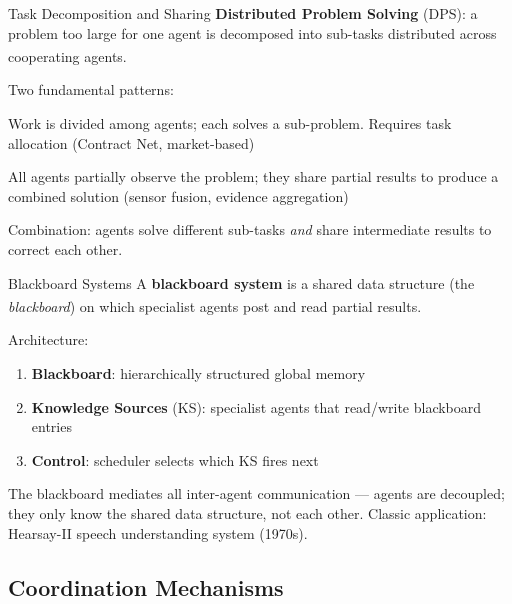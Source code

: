 \begin{v3topic}{Task Decomposition and Sharing}
    \textbf{Distributed Problem Solving} (DPS): a problem too large for one
    agent is decomposed into sub-tasks distributed across cooperating agents.
    \textsuperscript{\cite[][p.~154]{weissMultiagentSystems2013}}

    Two fundamental patterns:
    \begin{description}[leftmargin=0.6cm, labelindent=0pt]
        \item[\textbf{Task sharing}] Work is divided among agents; each solves a sub-problem.
              Requires task allocation (Contract Net, market-based)
        \item[\textbf{Result sharing}] All agents partially observe the problem; they share
              partial results to produce a combined solution (sensor fusion, evidence aggregation)
    \end{description}
    Combination: agents solve different sub-tasks \emph{and} share intermediate
    results to correct each other.

\end{v3topic}
\begin{v3topic}{Blackboard Systems}
    A \textbf{blackboard system} is a shared data structure (the
    \emph{blackboard}) on which specialist agents post and read partial
    results.\textsuperscript{\cite[][p.~157]{weissMultiagentSystems2013}}

    Architecture:
    \begin{enumerate}
        \item \textbf{Blackboard}: hierarchically structured global memory
        \item \textbf{Knowledge Sources} (KS): specialist agents that read/write blackboard entries
        \item \textbf{Control}: scheduler selects which KS fires next
    \end{enumerate}
    The blackboard mediates all inter-agent communication --- agents are
    decoupled; they only know the shared data structure, not each other.
    Classic application: Hearsay-II speech understanding system (1970s).

\end{v3topic}

\subsection{Coordination Mechanisms}

